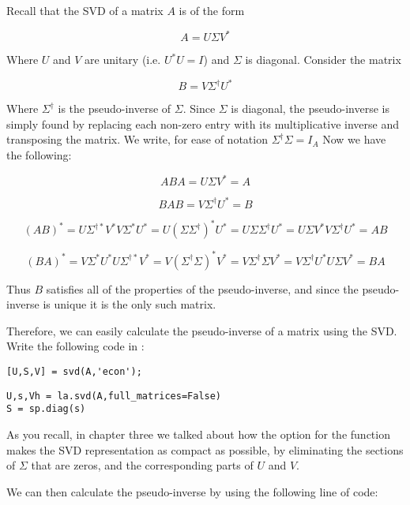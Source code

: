 Recall that the SVD of a matrix $A$ is of the form

\[
A = U \Sigma V^*
\]

Where $U$ and $V$ are unitary (i.e. $U^*U = I$) and $\Sigma$ is diagonal. Consider the matrix

\[
B = V \Sigma^\dagger U^*
\]

Where $\Sigma^\dagger$ is the pseudo-inverse of $\Sigma$. Since $\Sigma$ is diagonal, the pseudo-inverse is simply found by replacing each non-zero entry with its multiplicative inverse and transposing the matrix. We write, for ease of notation $\Sigma^\dagger \Sigma = I_A$ Now we have the following:

\[
ABA = U \Sigma V^* = A
\]

\[
BAB = V \Sigma^\dagger U^* = B
\]

\[
(AB)^* = U \Sigma^{\dagger *} V^* V \Sigma^* U^* = U (\Sigma \Sigma^\dagger)^* U^* = U \Sigma \Sigma^\dagger U^* = U \Sigma V^* V \Sigma^\dagger U^* = AB
\]

\[
(BA)^* =  V \Sigma^* U^* U \Sigma^{\dagger *} V^* = V (\Sigma^\dagger \Sigma)^* V^* = V  \Sigma^\dagger \Sigma V^* =  V \Sigma^\dagger U^* U \Sigma V^* = BA
\]

Thus $B$ satisfies all of the properties of the pseudo-inverse, and since the pseudo-inverse is unique it is the only such matrix.

Therefore, we can easily calculate the pseudo-inverse of a matrix using the SVD. Write the following code in \ProgrammingLanguage :

\begin{matlab}
\begin{lstlisting}[style=matlab]
[U,S,V] = svd(A,'econ');
\end{lstlisting}
\end{matlab}
\begin{python}
\begin{lstlisting}[style=python]
U,s,Vh = la.svd(A,full_matrices=False)
S = sp.diag(s)
\end{lstlisting}
\end{python}

\begin{matlab}%
As you recall, in chapter three we talked about how the  option for the  function makes the SVD representation as compact as possible, by eliminating the sections of $\Sigma$ that are zeros, and the corresponding parts of $U$ and $V$. \end{matlab}We can then calculate the pseudo-inverse by using the following line of code:

